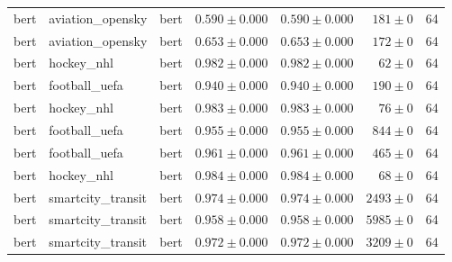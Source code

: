 \begin{table}[htbp]
\begin{tabular}{l l l r r r r}
bert & aviation\_opensky & bert & $0.590\pm0.000$ & $0.590\pm0.000$ & $181\pm0$ & 64 \\
bert & aviation\_opensky & bert & $0.653\pm0.000$ & $0.653\pm0.000$ & $172\pm0$ & 64 \\
bert & hockey\_nhl & bert & $0.982\pm0.000$ & $0.982\pm0.000$ & $62\pm0$ & 64 \\
bert & football\_uefa & bert & $0.940\pm0.000$ & $0.940\pm0.000$ & $190\pm0$ & 64 \\
bert & hockey\_nhl & bert & $0.983\pm0.000$ & $0.983\pm0.000$ & $76\pm0$ & 64 \\
bert & football\_uefa & bert & $0.955\pm0.000$ & $0.955\pm0.000$ & $844\pm0$ & 64 \\
bert & football\_uefa & bert & $0.961\pm0.000$ & $0.961\pm0.000$ & $465\pm0$ & 64 \\
bert & hockey\_nhl & bert & $0.984\pm0.000$ & $0.984\pm0.000$ & $68\pm0$ & 64 \\
bert & smartcity\_transit & bert & $0.974\pm0.000$ & $0.974\pm0.000$ & $2493\pm0$ & 64 \\
bert & smartcity\_transit & bert & $0.958\pm0.000$ & $0.958\pm0.000$ & $5985\pm0$ & 64 \\
bert & smartcity\_transit & bert & $0.972\pm0.000$ & $0.972\pm0.000$ & $3209\pm0$ & 64 \\
\hline
\end{tabular}
\end{table}
